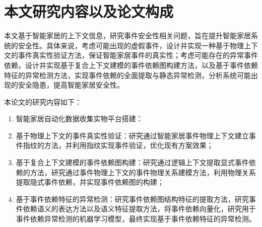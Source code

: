 \section{本文研究内容以及论文构成}

本文基于智能家居的上下文信息，研究事件安全性相关问题，旨在提升智能家居系统的安全性。具体来说，考虑可能出现的虚假事件，设计并实现一种基于物理上下文的事件真实性验证方法，保证智能家居事件的真实性；考虑可能存在的异常事件依赖，设计并实现基于复合上下文建模的事件依赖图构建方法，以及基于事件依赖特征的异常检测方法，实现事件依赖的全面提取与静态异常检测，分析系统可能出现的安全隐患，提高智能家居安全性。

本论文的研究内容如下：

\begin{enumerate}
	\item 智能家居自动化数据收集实物平台搭建：
	
	\item 基于物理上下文的事件真实性验证：研究通过智能家居事件物理上下文建立事件指纹的方法，并利用指纹实现事件验证，优化现有方案效果；
	\item 基于复合上下文建模的事件依赖图构建：研究通过逻辑上下文提取显式事件依赖的方法，研究通过事件物理上下文的事件物理关系建模方法，利用物理关系提取隐式事件依赖，并实现事件依赖图的构建；
	\item 基于事件依赖特征的异常检测：研究事件依赖图结构特征的提取方法，研究事件依赖语义的表达方法以及语义特征提取方法，将事件依赖向量化，研究用于事件依赖异常检测的机器学习模型，最终实现基于事件依赖特征的异常检测。
\end{enumerate}

